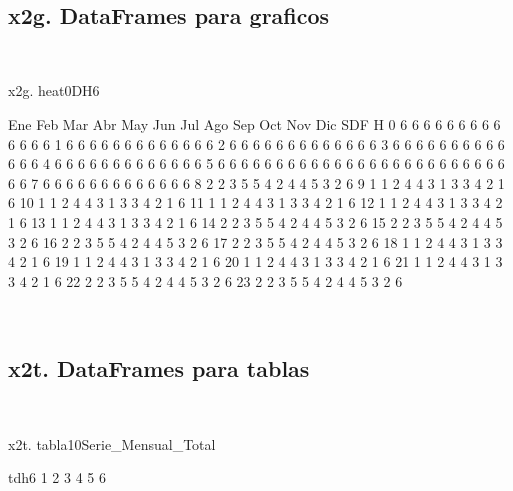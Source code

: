 \documentclass[a4paper,10pt]{article}
\begin{document}
\begin{Form}
\
\newpage 
\subsection{x2g. DataFrames para graficos}\

x2g. heat0DH6

    Ene  Feb  Mar  Abr  May  Jun  Jul  Ago  Sep  Oct  Nov  Dic  SDF
H                                                                  
0     6    6    6    6    6    6    6    6    6    6    6    6    6
1     6    6    6    6    6    6    6    6    6    6    6    6    6
2     6    6    6    6    6    6    6    6    6    6    6    6    6
3     6    6    6    6    6    6    6    6    6    6    6    6    6
4     6    6    6    6    6    6    6    6    6    6    6    6    6
5     6    6    6    6    6    6    6    6    6    6    6    6    6
6     6    6    6    6    6    6    6    6    6    6    6    6    6
7     6    6    6    6    6    6    6    6    6    6    6    6    6
8     2    2    3    5    5    4    2    4    4    5    3    2    6
9     1    1    2    4    4    3    1    3    3    4    2    1    6
10    1    1    2    4    4    3    1    3    3    4    2    1    6
11    1    1    2    4    4    3    1    3    3    4    2    1    6
12    1    1    2    4    4    3    1    3    3    4    2    1    6
13    1    1    2    4    4    3    1    3    3    4    2    1    6
14    2    2    3    5    5    4    2    4    4    5    3    2    6
15    2    2    3    5    5    4    2    4    4    5    3    2    6
16    2    2    3    5    5    4    2    4    4    5    3    2    6
17    2    2    3    5    5    4    2    4    4    5    3    2    6
18    1    1    2    4    4    3    1    3    3    4    2    1    6
19    1    1    2    4    4    3    1    3    3    4    2    1    6
20    1    1    2    4    4    3    1    3    3    4    2    1    6
21    1    1    2    4    4    3    1    3    3    4    2    1    6
22    2    2    3    5    5    4    2    4    4    5    3    2    6
23    2    2    3    5    5    4    2    4    4    5    3    2    6 \

\
\newpage 
\subsection{x2t. DataFrames para tablas}\

x2t. tabla10Serie_Mensual_Total

tdh6        1        2        3        4        5        6
                                                          

\end{Form}
\end{document}
